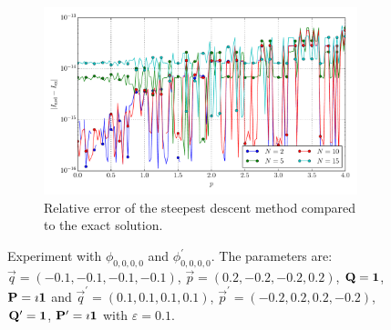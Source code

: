 \documentclass[a4paper,10pt]{article}
\begin{document}
\begin{figure}[ht!]
\begin{subfigure}[t]{0.5\linewidth}
    \includegraphics[width=\linewidth]{./plots/tp_4d_conv_p_(0,0,0,0)_(0,0,0,0)_err_rel_nsd.pdf}
    \caption{Relative error of the steepest descent method compared to the exact solution.}
    \label{fig:tp_4d_conv_p_0000_0000_err_nsd}
  \end{subfigure}
  \label{fig:tp_4d_conv_p_0000_0000}
  \caption{Experiment with $\phi_{0,0,0,0}$ and $\phi_{0,0,0,0}^{\prime}$.
  The parameters are:
  $\vec{q} = (-0.1, -0.1, -0.1, -0.1)$,
  $\vec{p} = ( 0.2, -0.2, -0.2,  0.2)$,
  $\mathbf{Q} = \mathbf{1}$,
  $\mathbf{P} = \imath \mathbf{1}$
  and
  $\vec{q}^\prime = ( 0.1, 0.1, 0.1,  0.1)$,
  $\vec{p}^\prime = (-0.2, 0.2, 0.2, -0.2)$,
  $\mathbf{Q}^\prime = \mathbf{1}$,
  $\mathbf{P}^\prime = \imath \mathbf{1}$
  with $\varepsilon=0.1$.}
\end{figure}
\end{document}

